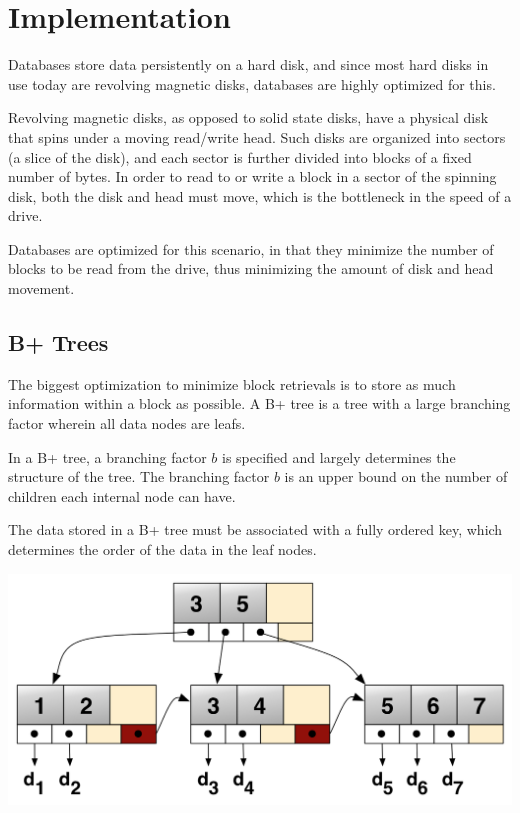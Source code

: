 \chapter{Implementation}

Databases store data persistently on a hard disk, and since most hard
disks in use today are revolving magnetic disks, databases are highly
optimized for this.

Revolving magnetic disks, as opposed to solid state disks, have a
physical disk that spins under a moving read/write head.  Such disks
are organized into sectors (a slice of the disk), and each sector is
further divided into blocks of a fixed number of bytes.  In order to
read to or write a block in a sector of the spinning disk, both the
disk and head must move, which is the bottleneck in the speed of a
drive.

Databases are optimized for this scenario, in that they minimize the
number of blocks to be read from the drive, thus minimizing the amount
of disk and head movement.

\section{B+ Trees}

The biggest optimization to minimize block retrievals is to store as
much information within a block as possible.  A B+ tree is a tree with
a large branching factor wherein all data nodes are leafs.

In a B+ tree, a branching factor $b$ is specified and largely
determines the structure of the tree.  The branching factor $b$ is an
upper bound on the number of children each internal node can have.

The data stored in a B+ tree must be associated with a fully ordered
key, which determines the order of the data in the leaf nodes.

\begin{center}
\includegraphics[scale=0.4]{figs/Bplustree.png}
\end{center}


